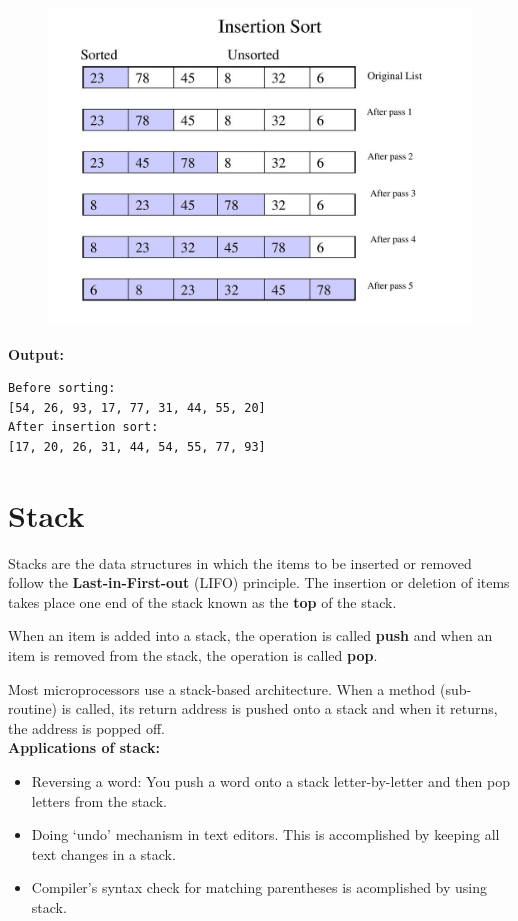 \documentclass[12pt]{article}
\begin{document}
\begin{figure}[h]
	\centering
	\includegraphics[scale=1.2]{src/sort/pic/picinsertion.jpg}
\end{figure}


\textbf{Output:}
\begin{lstlisting}
Before sorting:
[54, 26, 93, 17, 77, 31, 44, 55, 20]
After insertion sort:
[17, 20, 26, 31, 44, 54, 55, 77, 93]
\end{lstlisting}

\newpage
\section{Stack}
Stacks are the data structures in which the items to be inserted or removed follow the \textbf{Last-in-First-out} (LIFO) principle. The insertion or deletion of items takes place one end of the stack known as the \textbf{top} of the stack. 

When an item is added into a stack, the operation is called \textbf{push} and when an item is removed from the stack, the operation is called \textbf{pop}.

Most microprocessors use a stack-based architecture. When a method (sub-routine) is called, its return address is pushed onto a stack and when it returns, the address is popped off.\\

\textbf{Applications of stack:}

\begin{itemize}
	\item Reversing a word: You push a word onto a stack letter-by-letter and then pop letters from the stack.
	\item Doing `undo' mechanism in text editors. This is accomplished by keeping all text changes in a stack.
	\item Compiler's syntax check for matching parentheses is acomplished by using stack.
\end{itemize}
\end{document}
